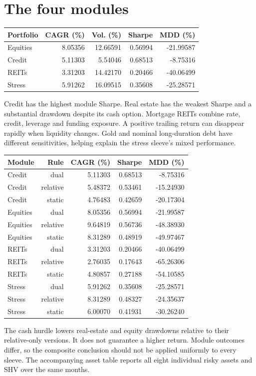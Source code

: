 \documentclass[11pt,letterpaper]{article}
\begin{document}
\section{The four modules}
\begin{center}\small\begin{tabular}{lrrrr}\toprule
Portfolio & CAGR (\%) & Vol. (\%) & Sharpe & MDD (\%)\\\midrule
Equities & 8.05356 & 12.66591 & 0.56994 & -21.99587\\
Credit & 5.11303 & 5.54046 & 0.68513 & -8.75316\\
REITs & 3.31203 & 14.42170 & 0.20466 & -40.06499\\
Stress & 5.91262 & 16.09515 & 0.35608 & -25.28571\\
\bottomrule\end{tabular}\end{center}
Credit has the highest module Sharpe. Real estate has the weakest Sharpe and a substantial drawdown despite its cash option. Mortgage REITs combine rate, credit, leverage and funding exposure. A positive trailing return can disappear rapidly when liquidity changes. Gold and nominal long-duration debt have different sensitivities, helping explain the stress sleeve's mixed performance.
\begin{center}\small\begin{tabular}{lrrrr}\toprule
Module & Rule & CAGR (\%) & Sharpe & MDD (\%)\\\midrule
Credit & dual & 5.11303 & 0.68513 & -8.75316\\
Credit & relative & 5.48372 & 0.53461 & -15.24930\\
Credit & static & 4.76483 & 0.42659 & -20.17304\\
Equities & dual & 8.05356 & 0.56994 & -21.99587\\
Equities & relative & 9.64819 & 0.56736 & -48.38930\\
Equities & static & 8.31289 & 0.48919 & -49.97467\\
REITs & dual & 3.31203 & 0.20466 & -40.06499\\
REITs & relative & 2.76035 & 0.17643 & -65.26306\\
REITs & static & 4.80857 & 0.27188 & -54.10585\\
Stress & dual & 5.91262 & 0.35608 & -25.28571\\
Stress & relative & 8.31289 & 0.48327 & -24.35637\\
Stress & static & 6.00070 & 0.41931 & -30.26240\\
\bottomrule\end{tabular}\end{center}
The cash hurdle lowers real-estate and equity drawdowns relative to their relative-only versions. It does not guarantee a higher return. Module outcomes differ, so the composite conclusion should not be applied uniformly to every sleeve. The accompanying asset table reports all eight individual risky assets and SHV over the same months.
\end{document}

